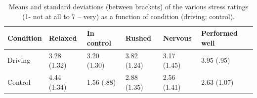 \documentclass[authordate, empirical, issue]{jote-new-article}
\begin{document}
\begin{table}[t]
  \begin{fullwidth}
    \caption{Means and standard deviations (between brackets) of the various stress ratings (1- not at all to 7 – very) as a function of condition (driving; control).}
    \label{tab:tab3}
    \begin{tabularx}{\textwidth}{@{} X X X X X X  @{}}
      \toprule
      \textbf{Condition} & \textbf{Relaxed}
                         & \textbf{In control} & \textbf{Rushed}
                         & \textbf{Nervous}    & \textbf{Performed well}

      \\
      \midrule

      Driving            & 3.28 (1.32)         & 3.20 (1.30)             & 3.82 (1.24) & 3.17 (1.45)
                         & 3.95 (.95)                                                                \\

      Control            & 4.44 (1.34)         & 1.56 (.88)              & 2.88 (1.35) & 2.56 (1.41)
                         & 2.63 (1.07)                                                               \\
      \bottomrule
    \end{tabularx}
  \end{fullwidth}
\end{table}
\end{document}
